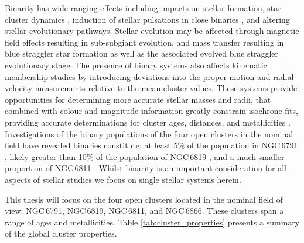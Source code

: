 Binarity has wide-ranging effects including impacts on stellar formation, star-cluster dynamics \citep{kroupa_binary_2001}, induction of stellar pulsations in close binaries \citep{hambleton_kic_2018}, and altering stellar evolutionary pathways. Stellar evolution may be affected through magnetic field effects resulting in sub-subgiant evolution, and mass transfer resulting in blue straggler star formation \citep{knigge_binary_2009} as well as the associated evolved blue straggler evolutionary stage. The presence of binary systems also affects kinematic membership studies by introducing deviations into the proper motion and radial velocity measurements relative to the mean cluster values. These systems provide opportunities for determining more accurate stellar masses and radii, that combined with colour and magnitude information greatly constrain isochrone fits, providing accurate determinations for cluster ages, distances, and metallicities \citep{hoyman_analysis_2019}. Investigations of the binary populations of the four open clusters in the nominal \Kepler{} field have revealed binaries constitute; at least 5\% of the population in NGC\,6791 \citep{rucinski_search_1996, marchi_variable_2007, sandquist_k2_2018, brogaard_age_2012, brogaard_testing_2016, corsaro_asteroseismology_2012}, likely greater than 10\% of the population of NGC\,6819 \citep{talamantes_bright_2010, hole_wiyn_2009, jeffries_wocs_2013, handberg_peakbagging_2016}, and a much smaller proportion of NGC\,6811 \citep{sandquist_age_2016}. Whilst binarity is an important consideration for all aspects of stellar studies we focus on single stellar systems herein.

This thesis will focus on the four open clusters located in the nominal \Kepler field of view: NGC\,6791, NGC\,6819, NGC\,6811, and NGC\,6866. These clusters span a range of ages and metallicities. Table \ref{tab:cluster_properties} presents a summary of the global cluster properties.

